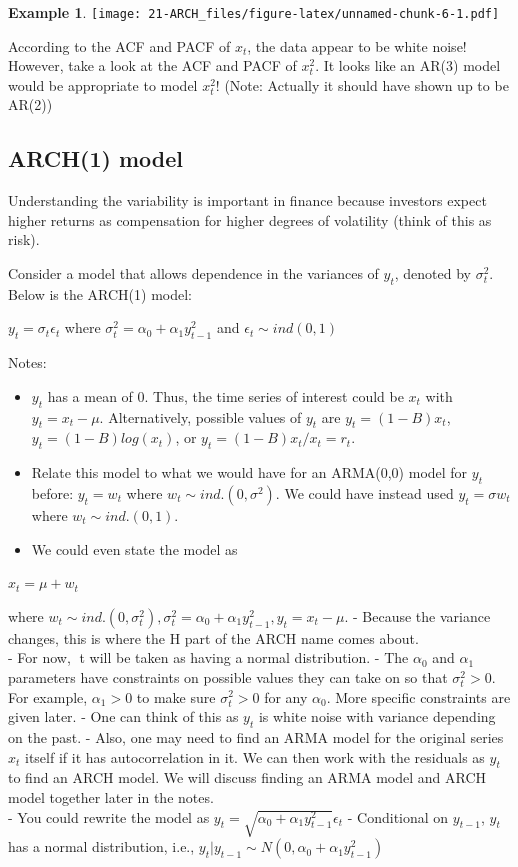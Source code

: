 \documentclass[
]{book}
\providecommand{\tightlist}{%
  \setlength{\itemsep}{0pt}\setlength{\parskip}{0pt}}
\theoremstyle{definition}
\theoremstyle{definition}
\newtheorem{example}{Example}[chapter]
\theoremstyle{definition}
\theoremstyle{definition}
\theoremstyle{remark}
\begin{document}
\begin{example}
\texttt{[image: 21-ARCH\_files/figure-latex/unnamed-chunk-6-1.pdf]}

According to the ACF and PACF of \(x_t\), the data appear to be white noise! However, take a look at the ACF and PACF of \(x_t^2\). It looks like an AR(3) model would be appropriate to model \(x_t^2\)! (Note: Actually it should have shown up to be AR(2))
\end{example}

\hypertarget{arch1-model}{%
\subsection{ARCH(1) model}\label{arch1-model}}

Understanding the variability is important in finance because investors expect higher returns as compensation for higher degrees of volatility (think of this as risk).

Consider a model that allows dependence in the variances of \(y_t\), denoted by \(\sigma_t^2\). Below is the ARCH(1) model:

\(y_t=\sigma_t\epsilon_t\) where \(\sigma_t^2=\alpha_0+\alpha_1y^2_{t-1}\) and \(\epsilon_t\sim ind(0,1)\)

Notes:

\begin{itemize}
\tightlist
\item
  \(y_t\) has a mean of 0. Thus, the time series of interest could be \(x_t\) with \(y_t = x_t -\mu\). Alternatively, possible values of \(y_t\) are \(y_t = (1-B)x_t\), \(y_t = (1-B)log(x_t)\), or \(y_t = (1-B)x_t / x_t = r_t\).
\item
  Relate this model to what we would have for an ARMA(0,0) model for \(y_t\) before: \(y_t = w_t\) where \(w_t \sim ind.(0,\sigma^2)\). We could have instead used \(y_t = \sigma w_t\) where \(w_t \sim ind.(0,1)\).
\item
  We could even state the model as
\end{itemize}

\(x_t = \mu + w_t\)

where \(w_t \sim ind.(0, \sigma_t^2), \sigma_t^2= \alpha_0 + \alpha_1y^2_{t-1}, y_t = x_t - \mu\).
- Because the variance changes, this is where the H part of the ARCH name comes about.\\
- For now, t will be taken as having a normal distribution.
- The \(\alpha_0\) and \(\alpha_1\) parameters have constraints on possible values they can take on so that \(\sigma_t^2 > 0\). For example, \(\alpha_1 > 0\) to make sure \(\sigma_t^2> 0\) for any \(\alpha_0\). More specific constraints are given later.
- One can think of this as \(y_t\) is white noise with variance depending on the past.
- Also, one may need to find an ARMA model for the original series \(x_t\) itself if it has autocorrelation in it. We can then work with the residuals as \(y_t\) to find an ARCH model. We will discuss finding an ARMA model and ARCH model together later in the notes.\\
- You could rewrite the model as \(y_t=\sqrt{\alpha_0+\alpha_1y^2_{t-1}}\epsilon_t\)
- Conditional on \(y_{t-1}\), \(y_t\) has a normal distribution, i.e., \(y_t|y_{t-1} \sim N(0, \alpha_0+\alpha_1y^2_{t-1})\)
\end{document}
